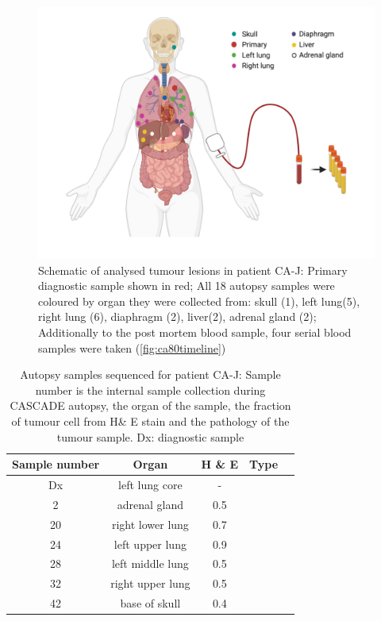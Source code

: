 \begin{figure}[ht]
\centering
\includegraphics[width=.99\linewidth]{Figures/CASCADE/CA80/CA-J_schematic_CA80_organColours}
\caption[Schematic of analysed tumour lesions in patient CA-J]{Schematic of analysed tumour lesions in patient CA-J: Primary diagnostic sample shown in red; All 18 autopsy samples were coloured by organ they were collected from: skull (1), left lung(5), right lung (6), diaphragm (2), liver(2), adrenal gland (2); Additionally to the post mortem blood sample, four serial blood samples were taken (\protect\autoref{fig:ca80timeline})} \label{fig:cas80schematic}
\end{figure}

\begin{table}[ht]
\caption[Autopsy samples sequenced for patient CA-J]{Autopsy samples sequenced for patient CA-J: Sample number is the internal sample collection during CASCADE autopsy, the organ of the sample, the fraction of tumour cell from H\& E stain and the pathology of the tumour sample. Dx: diagnostic sample}\label{tab:ca80wgsSamples}
\centering
{}
\begin{tabular}{|c|c|c|c|c|}
\toprule
\hline
 \rowcolor{gray!50}
\textbf{Sample number} & \textbf{Organ} & \textbf{H \& E} & \textbf{Type}\\
\hline
 Dx & left lung core & - & \cellcolor{white} \\
 2 & adrenal gland & 0.5 & \cellcolor{white} \\
 20 & right lower lung & 0.7 & \cellcolor{white} \\
 24 & left upper lung & 0.9 & \cellcolor{white} \\
 28 & left middle lung & 0.5 & \cellcolor{white} \\
 32 & right upper lung & 0.5 & \cellcolor{white} \\
 42 & base of skull & 0.4 & \cellcolor{white}\multirow{-7}{*}{adenocarcinoma} \\
 \hline
\bottomrule
\end{tabular}
\end{table} 

